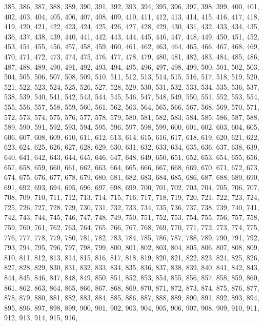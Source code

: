 \documentclass[a4paper,11pt]{article}
\begin{document}
385, 386, 387, 388, 389, 390, 391, 392, 393, 394, 395, 396, 397, 398,
399, 400, 401, 402, 403, 404, 405, 406, 407, 408, 409, 410, 411, 412,
413, 414, 415, 416, 417, 418, 419, 420, 421, 422, 423, 424, 425, 426,
427, 428, 429, 430, 431, 432, 433, 434, 435, 436, 437, 438, 439, 440,
441, 442, 443, 444, 445, 446, 447, 448, 449, 450, 451, 452, 453, 454,
455, 456, 457, 458, 459, 460, 461, 462, 463, 464, 465, 466, 467, 468,
469, 470, 471, 472, 473, 474, 475, 476, 477, 478, 479, 480, 481, 482,
483, 484, 485, 486, 487, 488, 489, 490, 491, 492, 493, 494, 495, 496,
497, 498, 499, 500, 501, 502, 503, 504, 505, 506, 507, 508, 509, 510,
511, 512, 513, 514, 515, 516, 517, 518, 519, 520, 521, 522, 523, 524,
525, 526, 527, 528, 529, 530, 531, 532, 533, 534, 535, 536, 537, 538,
539, 540, 541, 542, 543, 544, 545, 546, 547, 548, 549, 550, 551, 552,
553, 554, 555, 556, 557, 558, 559, 560, 561, 562, 563, 564, 565, 566,
567, 568, 569, 570, 571, 572, 573, 574, 575, 576, 577, 578, 579, 580,
581, 582, 583, 584, 585, 586, 587, 588, 589, 590, 591, 592, 593, 594,
595, 596, 597, 598, 599, 600, 601, 602, 603, 604, 605, 606, 607, 608,
609, 610, 611, 612, 613, 614, 615, 616, 617, 618, 619, 620, 621, 622,
623, 624, 625, 626, 627, 628, 629, 630, 631, 632, 633, 634, 635, 636,
637, 638, 639, 640, 641, 642, 643, 644, 645, 646, 647, 648, 649, 650,
651, 652, 653, 654, 655, 656, 657, 658, 659, 660, 661, 662, 663, 664,
665, 666, 667, 668, 669, 670, 671, 672, 673, 674, 675, 676, 677, 678,
679, 680, 681, 682, 683, 684, 685, 686, 687, 688, 689, 690, 691, 692,
693, 694, 695, 696, 697, 698, 699, 700, 701, 702, 703, 704, 705, 706,
707, 708, 709, 710, 711, 712, 713, 714, 715, 716, 717, 718, 719, 720,
721, 722, 723, 724, 725, 726, 727, 728, 729, 730, 731, 732, 733, 734,
735, 736, 737, 738, 739, 740, 741, 742, 743, 744, 745, 746, 747, 748,
749, 750, 751, 752, 753, 754, 755, 756, 757, 758, 759, 760, 761, 762,
763, 764, 765, 766, 767, 768, 769, 770, 771, 772, 773, 774, 775, 776,
777, 778, 779, 780, 781, 782, 783, 784, 785, 786, 787, 788, 789, 790,
791, 792, 793, 794, 795, 796, 797, 798, 799, 800, 801, 802, 803, 804,
805, 806, 807, 808, 809, 810, 811, 812, 813, 814, 815, 816, 817, 818,
819, 820, 821, 822, 823, 824, 825, 826, 827, 828, 829, 830, 831, 832,
833, 834, 835, 836, 837, 838, 839, 840, 841, 842, 843, 844, 845, 846,
847, 848, 849, 850, 851, 852, 853, 854, 855, 856, 857, 858, 859, 860,
861, 862, 863, 864, 865, 866, 867, 868, 869, 870, 871, 872, 873, 874,
875, 876, 877, 878, 879, 880, 881, 882, 883, 884, 885, 886, 887, 888,
889, 890, 891, 892, 893, 894, 895, 896, 897, 898, 899, 900, 901, 902,
903, 904, 905, 906, 907, 908, 909, 910, 911, 912, 913, 914, 915, 916,
\end{document}
